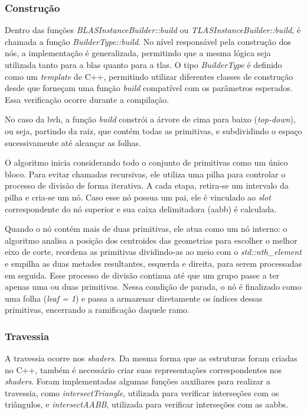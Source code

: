 \subsubsection{Construção}

Dentro das funções \textit{BLASInstanceBuilder::build} ou \textit{TLASInstanceBuilder::build}, é chamada a função \textit{BuilderType::build}. No nível responsável pela construção dos nós, a implementação é generalizada, permitindo que a mesma lógica seja utilizada tanto para a \gls{blas} quanto para a \gls{tlas}. O tipo \textit{BuilderType} é definido como um \textit{template} de C++, permitindo utilizar diferentes classes de construção desde que forneçam uma função \textit{build} compatível com os parâmetros esperados. Essa verificação ocorre durante a compilação.

No caso da \gls{bvh}, a função \textit{build} constrói a árvore de cima para baixo (\textit{top-down}), ou seja, partindo da raiz, que contém todas as primitivas, e subdividindo o espaço sucessivamente até alcançar as folhas.

O algoritmo inicia considerando todo o conjunto de primitivas como um único bloco. Para evitar chamadas recursivas, ele utiliza uma pilha para controlar o processo de divisão de forma iterativa. A cada etapa, retira-se um intervalo da pilha e cria-se um nó. Caso esse nó possua um pai, ele é vinculado ao \textit{slot} correspondente do nó superior e sua caixa delimitadora (\gls{aabb}) é calculada.

Quando o nó contém mais de duas primitivas, ele atua como um nó interno: o algoritmo analisa a posição dos centroides das geometrias para escolher o melhor eixo de corte, reordena as primitivas dividindo-as ao meio com o \textit{std::nth\_element} e empilha as duas metades resultantes, esquerda e direita, para serem processadas em seguida. Esse processo de divisão continua até que um grupo passe a ter apenas uma ou duas primitivas. Nessa condição de parada, o nó é finalizado como uma folha (\textit{leaf = 1}) e passa a armazenar diretamente os índices dessas primitivas, encerrando a ramificação daquele ramo.

\subsubsection{Travessia}

A travessia ocorre nos \textit{shaders}. Da mesma forma que as estruturas foram criadas no C++, também é necessário criar suas representações correspondentes nos \textit{shaders}. Foram implementadas algumas funções auxiliares para realizar a travessia, como \textit{intersectTriangle}, utilizada para verificar interseções com os triângulos, e \textit{intersectAABB}, utilizada para verificar interseções com as \glspl{aabb}.

